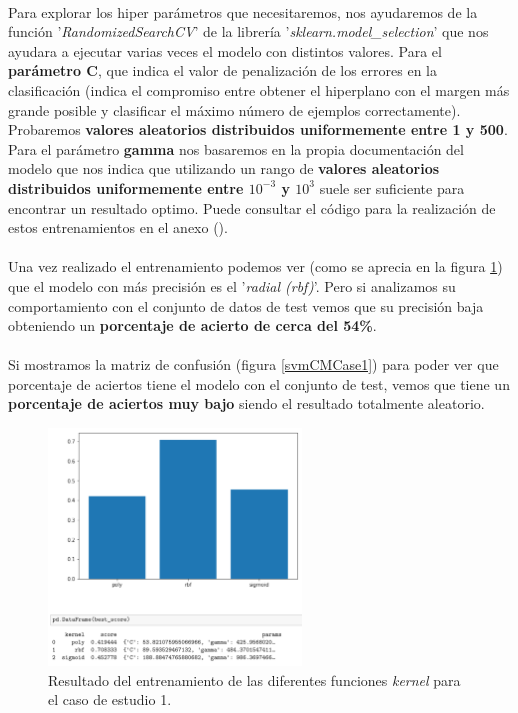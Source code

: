 {\paragraph{}
Para explorar los hiper parámetros que necesitaremos, nos ayudaremos de la función '\textit{RandomizedSearchCV}' de la librería '\textit{sklearn.model\_selection}' que nos ayudara a ejecutar varias veces el modelo con distintos valores. Para el \textbf{parámetro C}, que indica el valor de penalización de los errores en la clasificación (indica el compromiso entre obtener el hiperplano con el margen más grande posible y clasificar el máximo número de ejemplos correctamente). Probaremos \textbf{valores aleatorios distribuidos uniformemente entre 1 y 500}. Para el parámetro \textbf{gamma} nos basaremos en la propia documentación del modelo que nos indica que utilizando un rango de \textbf{valores aleatorios distribuidos uniformemente entre $10^{-3}$ y $10^{3}$} suele ser suficiente para encontrar un resultado optimo. Puede consultar el código para la realización de estos entrenamientos en el anexo ().

\paragraph{}
Una vez realizado el entrenamiento podemos ver (como se aprecia en la figura \ref{svmTrainCase1}) que el modelo con más precisión es el '\textit{radial (rbf)}'. Pero si analizamos su comportamiento con el conjunto de datos de test vemos que su precisión baja obteniendo un \textbf{porcentaje de acierto de cerca del 54\%}.

\paragraph{}
Si mostramos la matriz de confusión\cite{ref:confusion_matrix} (figura \ref{svmCMCase1}) para poder ver que porcentaje de aciertos tiene el modelo con el conjunto de test, vemos que tiene un \textbf{porcentaje de aciertos muy bajo} siendo el resultado totalmente aleatorio.

\begin{figure}[!htb]
  \centering
		\includegraphics[width=0.6\textwidth]{images/resultados_svm_ent_conjunto1.png}
		\caption{Resultado del entrenamiento de las diferentes funciones \textit{kernel} para el caso de estudio 1.}
  \label{svmTrainCase1}
\end{figure}

}
